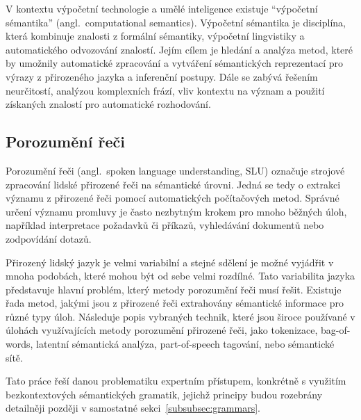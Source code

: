 V kontextu výpočetní technologie a umělé inteligence existuje \enquote{výpočetní sémantika} (angl.~computational semantics).
Výpočetní sémantika je disciplína, která kombinuje znalosti z formální sémantiky, výpočetní lingvistiky a automatického odvozování znalostí.
Jejím cílem je hledání a analýza metod, které by umožnily automatické zpracování a vytváření
sémantických reprezentací pro výrazy z přirozeného jazyka a inferenční postupy.
Dále se zabývá řešením neurčitostí, analýzou komplexních frází,
vliv kontextu na význam a použití získaných znalostí pro automatické rozhodování.~\cite{computational-semantics-blackburn-bos}~\cite{computation-semantics}

\subsection{Porozumění řeči}
Porozumění řeči (angl.~spoken language understanding, SLU) označuje strojové zpracování lidské přirozené řeči na sémantické úrovni.
Jedná se tedy o extrakci významu z přirozené řeči pomocí automatických počítačových metod.
Správné určení významu promluvy je často nezbytným krokem pro mnoho běžných úloh, například interpretace požadavků či příkazů,
vyhledávání dokumentů nebo zodpovídání dotazů.~\cite{the_conversational_interface}

Přirozený lidský jazyk je velmi variabilní a stejné sdělení je možné vyjádřit v mnoha podobách, které mohou být od sebe velmi rozdílné.
Tato variabilita jazyka představuje hlavní problém, který metody porozumění řeči musí řešit.
Existuje řada metod, jakými jsou z přirozené řeči extrahovány sémantické informace pro různé typy úloh.
Následuje popis vybraných technik, které jsou široce používané v úlohách využívajících
metody porozumění přirozené řeči, jako tokenizace, bag-of-words, latentní sémantická analýza, part-of-speech tagování, nebo sémantické sítě.~\cite{the_conversational_interface}

Tato práce řeší danou problematiku expertním přístupem, konkrétně s využitím bezkontextových sémantických gramatik,
jejichž principy budou rozebrány detailněji později v samostatné sekci~\ref{subsubsec:grammars}.

